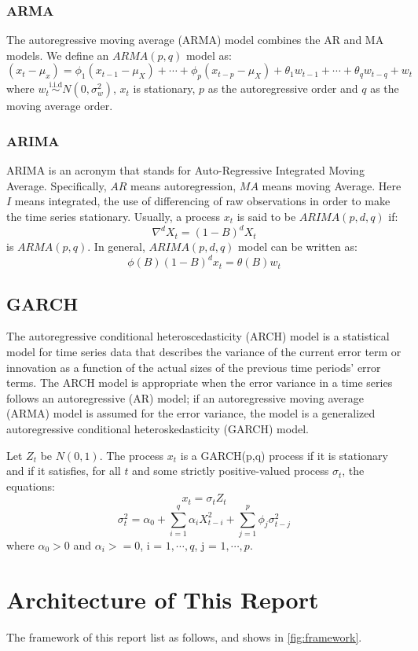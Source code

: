 \subsubsection{ARMA}
The autoregressive moving average (ARMA) model combines the AR and MA models. We define an $ARMA(p, q)$ model as:
$$ (x_t - \mu_x) = \phi_1 (x_{t-1} - \mu_X)  + \cdots + \phi_p (x_{t-p} - \mu_X) +  \theta_1 w_{t-1}  + \cdots + \theta_q w_{t-q} + w_t$$
where $w_t \overset{\text{i.i.d}}{\sim} N(0, \sigma_w^2)$, $x_t$ is stationary, $p$ as the autoregressive
order and $q$ as the moving average order. 

\subsubsection{ARIMA}
ARIMA is an acronym that stands for Auto-Regressive Integrated Moving Average. Specifically, $AR$ means autoregression, $MA$ means moving Average. Here $I$ means integrated, the use of differencing of raw observations in
order to make the time series stationary. Usually, a process $x_t$ is said to be $ARIMA(p, d, q)$ if:
$$ \nabla^d X_t  = (1-B)^d X_t$$
is $ARMA(p,q)$. In general, $ARIMA(p, d, q)$ model can be written as:
$$ \phi (B)(1-B)^d x_t = \theta(B) w_t $$

\subsection{GARCH}
The autoregressive conditional heteroscedasticity (ARCH) model is a statistical model for time series data that describes the variance of the current error term or innovation as a function of the actual sizes of the previous time periods' error terms. The ARCH model is appropriate when the error variance in a time series follows an autoregressive (AR) model; if an autoregressive moving average (ARMA) model is assumed for the error variance, the model is a generalized autoregressive conditional heteroskedasticity (GARCH) model.

Let $Z_t$ be $N(0,1)$. The process $x_t$ is a GARCH(p,q) process if it is stationary and if it satisfies, for all $t$ and some strictly positive-valued process $\sigma_t$, the equations:
$$ x_t  = \sigma_t Z_t$$
$$ \sigma_t^2 = \alpha_0 + \sum_{i = 1}^{q} \alpha_i X_{t-i}^2 + \sum_{j = 1}^{p} \phi_j \sigma_{t-j}^2 $$
where $\alpha_0 > 0$ and $\alpha_i >= 0$, i = $1,\cdots,q$, j = $1,\cdots,p$.

\section{Architecture of This Report}
The framework of this report list as follows, and shows in \ref{fig:framework}.

